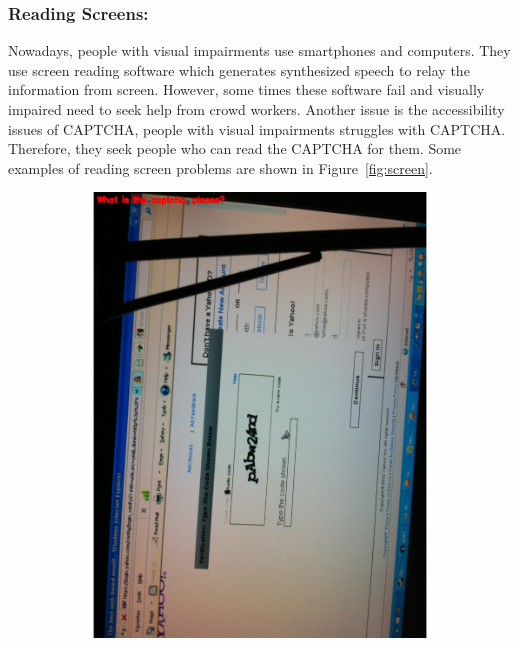 \documentclass[sigconf]{acmart}
\begin{document}
\subsubsection{Reading Screens:} Nowadays, people with visual impairments use smartphones and computers. They use screen reading software which generates synthesized speech to relay the information from screen. However, some times these software fail and visually impaired need to seek help from crowd workers. Another issue is the accessibility issues of CAPTCHA, people with visual impairments struggles with CAPTCHA. Therefore, they seek people who can read the CAPTCHA for them. Some examples of reading screen problems are shown in Figure~\ref{fig:screen}. 
\begin{figure}[hbp]
        \centering
        \begin{subfigure}[b]{0.45\columnwidth}
                \includegraphics[width=\textwidth]{images/screen_1.pdf}  
        \end{subfigure}%

\end{figure}
\end{document}
